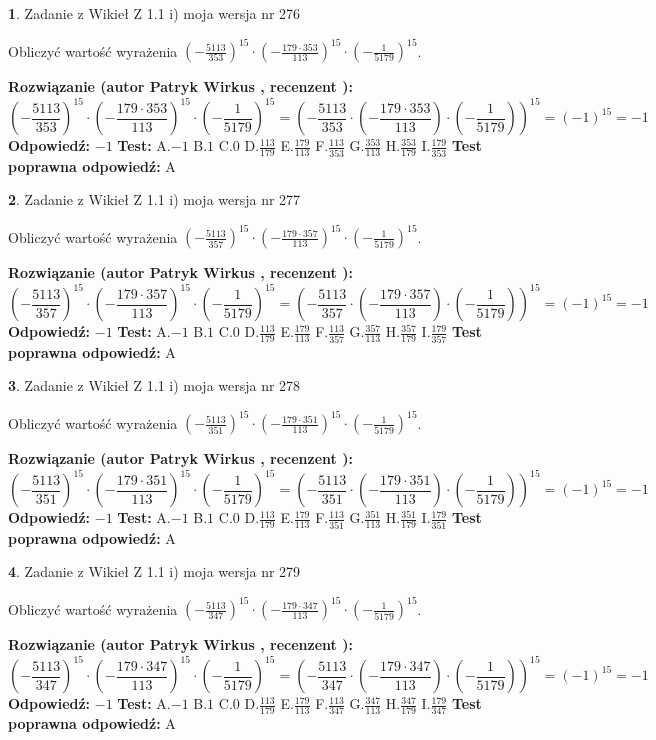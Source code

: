 \documentclass[12pt, a4paper]{article}
\theoremstyle{definition} %
\newtheorem{zad}{}
\newcommand{\zadStart}[1]{\begin{zad}#1\newline}
\newcommand{\zadStop}{\end{zad}}
\newcommand{\rozwStart}[2]{\noindent \textbf{Rozwiązanie (autor #1 , recenzent #2): }\newline}
\newcommand{\rozwStop}{\newline}
\newcommand{\odpStart}{\noindent \textbf{Odpowiedź:}\newline}
\newcommand{\odpStop}{\newline}
\newcommand{\testStart}{\noindent \textbf{Test:}\newline}
\newcommand{\testStop}{\newline}
\newcommand{\kluczStart}{\noindent \textbf{Test poprawna odpowiedź:}\newline}
\newcommand{\kluczStop}{\newline}
\begin{document}
\zadStart{Zadanie z Wikieł Z 1.1 i) moja wersja nr 276}

Obliczyć wartość wyrażenia $(-\frac{5113}{353})^{15} \cdot (-\frac{179 \cdot 353}{113})^{15} \cdot (-\frac{1}{5179})^{15}$.
\zadStop
\rozwStart{Patryk Wirkus}{}
$$(-\frac{5113}{353})^{15} \cdot (-\frac{179 \cdot 353}{113})^{15} \cdot (-\frac{1}{5179})^{15} = (-\frac{5113}{353} \cdot (-\frac{179 \cdot 353}{113}) \cdot (-\frac{1}{5179}))^{15} = (-1)^{15} = -1$$
\rozwStop
\odpStart
$-1$
\odpStop
\testStart
A.$-1$ B.$1$ C.$0$ D.$\frac{113}{179}$ E.$\frac{179}{113}$
F.$\frac{113}{353}$ G.$\frac{353}{113}$
H.$\frac{353}{179}$
I.$\frac{179}{353}$
\testStop
\kluczStart
A
\kluczStop



\zadStart{Zadanie z Wikieł Z 1.1 i) moja wersja nr 277}

Obliczyć wartość wyrażenia $(-\frac{5113}{357})^{15} \cdot (-\frac{179 \cdot 357}{113})^{15} \cdot (-\frac{1}{5179})^{15}$.
\zadStop
\rozwStart{Patryk Wirkus}{}
$$(-\frac{5113}{357})^{15} \cdot (-\frac{179 \cdot 357}{113})^{15} \cdot (-\frac{1}{5179})^{15} = (-\frac{5113}{357} \cdot (-\frac{179 \cdot 357}{113}) \cdot (-\frac{1}{5179}))^{15} = (-1)^{15} = -1$$
\rozwStop
\odpStart
$-1$
\odpStop
\testStart
A.$-1$ B.$1$ C.$0$ D.$\frac{113}{179}$ E.$\frac{179}{113}$
F.$\frac{113}{357}$ G.$\frac{357}{113}$
H.$\frac{357}{179}$
I.$\frac{179}{357}$
\testStop
\kluczStart
A
\kluczStop



\zadStart{Zadanie z Wikieł Z 1.1 i) moja wersja nr 278}

Obliczyć wartość wyrażenia $(-\frac{5113}{351})^{15} \cdot (-\frac{179 \cdot 351}{113})^{15} \cdot (-\frac{1}{5179})^{15}$.
\zadStop
\rozwStart{Patryk Wirkus}{}
$$(-\frac{5113}{351})^{15} \cdot (-\frac{179 \cdot 351}{113})^{15} \cdot (-\frac{1}{5179})^{15} = (-\frac{5113}{351} \cdot (-\frac{179 \cdot 351}{113}) \cdot (-\frac{1}{5179}))^{15} = (-1)^{15} = -1$$
\rozwStop
\odpStart
$-1$
\odpStop
\testStart
A.$-1$ B.$1$ C.$0$ D.$\frac{113}{179}$ E.$\frac{179}{113}$
F.$\frac{113}{351}$ G.$\frac{351}{113}$
H.$\frac{351}{179}$
I.$\frac{179}{351}$
\testStop
\kluczStart
A
\kluczStop



\zadStart{Zadanie z Wikieł Z 1.1 i) moja wersja nr 279}

Obliczyć wartość wyrażenia $(-\frac{5113}{347})^{15} \cdot (-\frac{179 \cdot 347}{113})^{15} \cdot (-\frac{1}{5179})^{15}$.
\zadStop
\rozwStart{Patryk Wirkus}{}
$$(-\frac{5113}{347})^{15} \cdot (-\frac{179 \cdot 347}{113})^{15} \cdot (-\frac{1}{5179})^{15} = (-\frac{5113}{347} \cdot (-\frac{179 \cdot 347}{113}) \cdot (-\frac{1}{5179}))^{15} = (-1)^{15} = -1$$
\rozwStop
\odpStart
$-1$
\odpStop
\testStart
A.$-1$ B.$1$ C.$0$ D.$\frac{113}{179}$ E.$\frac{179}{113}$
F.$\frac{113}{347}$ G.$\frac{347}{113}$
H.$\frac{347}{179}$
I.$\frac{179}{347}$
\testStop
\kluczStart
A
\kluczStop
\end{document}
